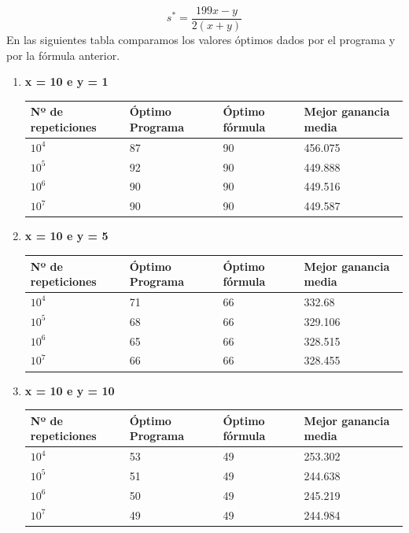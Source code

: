 \documentclass[]{article}
\begin{document}
$$s^{*}=\frac{199 x-y}{2(x+y)}$$
\newline
En las siguientes tabla comparamos los valores óptimos dados por el programa y por la fórmula anterior.
\begin{enumerate}
	\item \textbf{ x = 10 e y = 1}
	\begin{table}[H]
		\begin{center}
			\begin{tabular}{|l|l|l|l|}
				\hline
				Nº de repeticiones & Óptimo Programa & Óptimo fórmula& Mejor ganancia media\\
				\hline \hline
				$10^{4}$ & 87 & 90 &456.075
				\\ \hline
				$10^{5}$ & 92 & 90 & 449.888
				\\ \hline
				$10^{6}$ & 90 & 90 & 449.516
				\\ \hline
				$10^{7}$ & 90 & 90 & 449.587
				\\ \hline
				
			\end{tabular}
			\label{tabla:sencilla}
		\end{center}
	\end{table}

	\item \textbf{ x = 10 e y = 5}
	\begin{table}[H]
		\begin{center}
			\begin{tabular}{|l|l|l|l|}
				\hline
				Nº de repeticiones & Óptimo Programa & Óptimo fórmula & Mejor ganancia media\\
				\hline \hline
				$10^{4}$ & 71 & 66 & 332.68
				\\ \hline
				$10^{5}$ & 68 & 66 & 329.106
				\\ \hline
				$10^{6}$ & 65 & 66 & 328.515
				\\ \hline
				$10^{7}$ & 66 & 66 & 328.455
				\\ \hline
				
			\end{tabular}
			\label{tabla:sencilla}
		\end{center}
	\end{table}
	\newpage
	\item \textbf{ x = 10 e y = 10}
	\begin{table}[H]
		\begin{center}
			\begin{tabular}{|l|l|l|l|}
				\hline
				Nº de repeticiones & Óptimo Programa & Óptimo fórmula& Mejor ganancia media\\
				\hline \hline
				$10^{4}$ & 53 & 49 & 253.302
				\\ \hline
				$10^{5}$ & 51 & 49 & 244.638
				\\ \hline
				$10^{6}$ & 50 & 49 & 245.219
				\\ \hline
				$10^{7}$ & 49 & 49 & 244.984
				\\ \hline
				

\end{tabular}
\end{center}
\end{table}
\end{enumerate}
\end{document}
